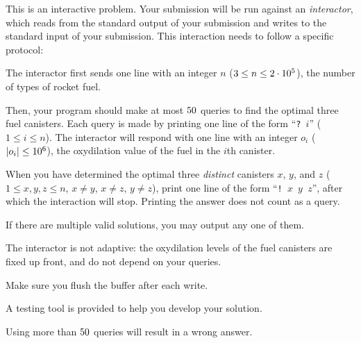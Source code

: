 \begin{Interaction}
    This is an interactive problem.
    Your submission will be run against an \emph{interactor},
    which reads from the standard output of your submission
    and writes to the standard input of your submission.
    This interaction needs to follow a specific protocol:

    The interactor first sends
    one line with an integer $n$ ($3\leq n\leq 2 \cdot 10^5$),
    the number of types of rocket fuel.

    Then, your program should make at most $50$ queries to find the optimal three fuel canisters.
    Each query is made by printing one line of the form ``\texttt{?~$i$}'' ($1\leq i\leq n$).
    The interactor will respond with one line with an integer $o_i$ ($|o_i| \leq 10^6$),
    the oxydilation value of the fuel in the $i$th canister.

    When you have determined the optimal three \emph{distinct} canisters $x$, $y$, and $z$
    ($1 \leq x,y,z \leq n$, $x \neq y$, $x \neq z$, $y \neq z$),
    print one line of the form ``\texttt{!~$x$~$y$~$z$}'',
    after which the interaction will stop.
    Printing the answer does not count as a query.

    If there are multiple valid solutions, you may output any one of them.

    The interactor is not adaptive:
    the oxydilation levels of the fuel canisters are fixed up front,
    and do not depend on your queries.

    Make sure you flush the buffer after each write.

    A testing tool is provided to help you develop your solution.

    Using more than $50$ queries will result in a wrong answer.
\end{Interaction}

